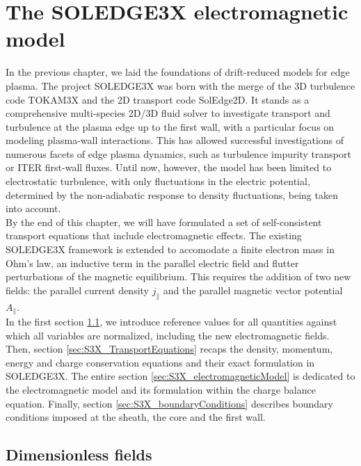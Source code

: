 \chapter{The SOLEDGE3X electromagnetic model}
\label{chap:SOLEDGE3X_framework}

In the previous chapter, we laid the foundations of drift-reduced models for edge plasma. The project SOLEDGE3X was born with the merge of the 3D turbulence code TOKAM3X\cite{tamain2016tokam3x} and the 2D transport code SolEdge2D\cite{Bufferand_2015}. It stands as a comprehensive multi-species 2D/3D fluid solver to investigate transport and turbulence at the plasma edge up to the first wall, with a particular focus on modeling plasma-wall interactions. This has allowed successful investigations of numerous facets of edge plasma dynamics, such as turbulence\cite{Bufferand_2021} impurity transport\cite{Ciraolo2021} or ITER first-wall fluxes\cite{Rivals2022}. Until now, however, the model has been limited to electrostatic turbulence, with only fluctuations in the electric potential, determined by the non-adiabatic response to density fluctuations, being taken into account. \\

By the end of this chapter, we will have formulated a set of self-consistent transport equations that include electromagnetic effects. The existing SOLEDGE3X framework is extended to accomodate a finite electron mass in Ohm's law, an inductive term in the parallel electric field and flutter perturbations of the magnetic equilibrium. This requires the addition of two new fields: the parallel current density $j_\parallel$ and the parallel magnetic vector potential $A_\parallel$. \\

In the first section \ref{sec:S3X_referenceValues}, we introduce reference values for all quantities against which all variables are normalized, including the new electromagnetic fields. Then, section \ref{sec:S3X_TransportEquations} recaps the density, momentum, energy and charge conservation equations and their exact formulation in SOLEDGE3X. The entire section \ref{sec:S3X_electromagneticModel} is dedicated to the electromagnetic model and its formulation within the charge balance equation. Finally, section \ref{sec:S3X_boundaryConditions} describes boundary conditions imposed at the sheath, the core and the first wall.



\section{Dimensionless fields}
\label{sec:S3X_referenceValues}

